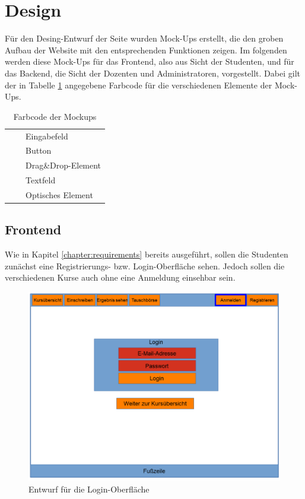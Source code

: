     
    \section{Design}
        Für den Desing-Entwurf der Seite wurden Mock-Ups erstellt, die den groben Aufbau der Website mit den entsprechenden Funktionen zeigen. 
        Im folgenden werden diese Mock-Ups für das  Frontend, also aus Sicht der Studenten, und für das Backend, die Sicht der Dozenten und Administratoren, vorgestellt.
        Dabei gilt der in Tabelle \ref{tab:Farbcode} angegebene Farbcode für die verschiedenen Elemente der Mock-Ups.
        \begin{table}[h]
            \centering
            \begin{tabular}{l c| l}
                \cellcolor{red} & & Eingabefeld\\
                \cellcolor{orange} & & Button\\
                \cellcolor{olive} & & Drag\&Drop-Element\\
                \cellcolor{green} & & Textfeld\\
                \cellcolor{blue} & & Optisches Element
            \end{tabular}
            \caption{Farbcode der Mockups}
            \label{tab:Farbcode}
        \end{table}
    
        \subsection{Frontend}
            Wie in Kapitel \ref{chapter:requirements} bereits ausgeführt, sollen die Studenten zunächst eine Registrierungs- bzw. Login-Oberfläche sehen.
            Jedoch sollen die verschiedenen Kurse auch ohne eine Anmeldung einsehbar sein.
            \begin{figure}[t]
            	\centering
            	\includegraphics[width=\textwidth]{./design/images/MockUpsFrontend/frontendLogin.png}
            	\caption{Entwurf für die Login-Oberfläche}
            	\label{fig:mockupLoginFrontend}
            \end{figure}   
        
